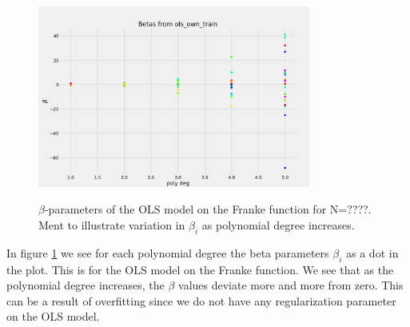 

\begin{figure}[H]
    \centering
    \includegraphics[width=0.8\textwidth]{Figures/b_beta.png}
    \label{fig:beta_plot}
    \caption{$\beta$-parameters of the OLS model on the Franke function for N=????. Ment to illustrate variation in $\beta_i$ as polynomial degree increases.}
\end{figure}

In figure \ref{fig:beta_plot} we see for each polynomial degree the beta parameters $\beta_i$ as a dot in the plot. This is for the OLS model on the Franke function. We see that as the polynomial degree increases, the $\beta$ values deviate more and more from zero. This can be a result of overfitting since we do not have any regularization parameter on the OLS model.



